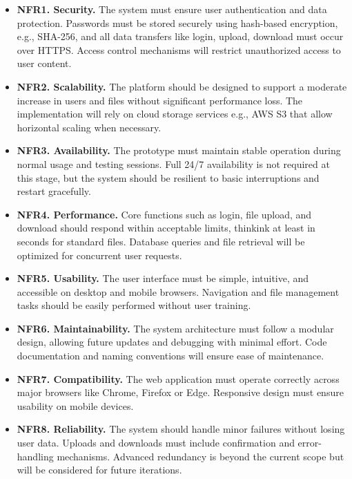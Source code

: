 \begin{itemize}
    \item \textbf{NFR1. Security.} 
    The system must ensure user authentication and data protection. Passwords must be stored securely using hash-based encryption, e.g., SHA-256, and all data transfers like login, upload, download must occur over HTTPS. Access control mechanisms will restrict unauthorized access to user content.

    \item \textbf{NFR2. Scalability.}
    The platform should be designed to support a moderate increase in users and files without significant performance loss. The implementation will rely on cloud storage services e.g., AWS S3 that allow horizontal scaling when necessary.

    \item \textbf{NFR3. Availability.}
    The prototype must maintain stable operation during normal usage and testing sessions. Full 24/7 availability is not required at this stage, but the system should be resilient to basic interruptions and restart gracefully.

    \item \textbf{NFR4. Performance.}
    Core functions such as login, file upload, and download should respond within acceptable limits, thinkink at least in seconds for standard files. Database queries and file retrieval will be optimized for concurrent user requests.

    \item \textbf{NFR5. Usability.}
    The user interface must be simple, intuitive, and accessible on desktop and mobile browsers. Navigation and file management tasks should be easily performed without user training.

    \item \textbf{NFR6. Maintainability.}
    The system architecture must follow a modular design, allowing future updates and debugging with minimal effort. Code documentation and naming conventions will ensure ease of maintenance.

    \item \textbf{NFR7. Compatibility.}
    The web application must operate correctly across major browsers like Chrome, Firefox or Edge. Responsive design must ensure usability on mobile devices.

    \item \textbf{NFR8. Reliability.}
    The system should handle minor failures without losing user data. Uploads and downloads must include confirmation and error-handling mechanisms. Advanced redundancy is beyond the current scope but will be considered for future iterations.


\end{itemize}
